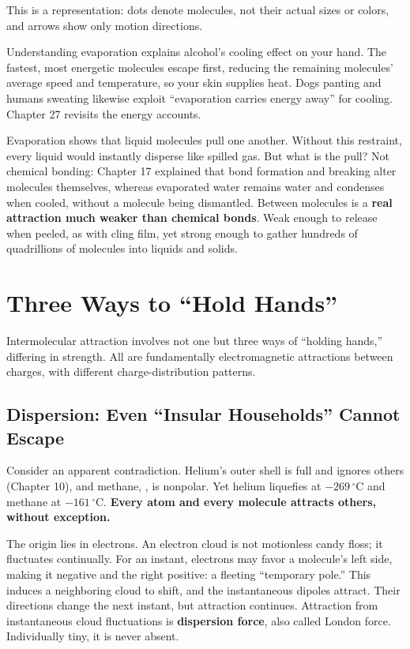 This is a representation: dots denote molecules, not their actual sizes or colors, and arrows show only motion directions.

Understanding evaporation explains alcohol's cooling effect on your hand. The fastest, most energetic molecules escape first, reducing the remaining molecules' average speed and temperature, so your skin supplies heat. Dogs panting and humans sweating likewise exploit ``evaporation carries energy away'' for cooling. Chapter 27 revisits the energy accounts.

Evaporation shows that liquid molecules pull one another. Without this restraint, every liquid would instantly disperse like spilled gas. But what is the pull? Not chemical bonding: Chapter 17 explained that bond formation and breaking alter molecules themselves, whereas evaporated water remains water and condenses when cooled, without a molecule being dismantled. Between molecules is a \textbf{real attraction much weaker than chemical bonds}. Weak enough to release when peeled, as with cling film, yet strong enough to gather hundreds of quadrillions of molecules into liquids and solids.

\section{Three Ways to ``Hold Hands''}

Intermolecular attraction involves not one but three ways of ``holding hands,'' differing in strength. All are fundamentally electromagnetic attractions between charges, with different charge-distribution patterns.

\subsection{Dispersion: Even ``Insular Households'' Cannot Escape}

Consider an apparent contradiction. Helium's outer shell is full and ignores others (Chapter 10), and methane, , is nonpolar. Yet helium liquefies at $-269\,^{\circ}\mathrm{C}$ and methane at $-161\,^{\circ}\mathrm{C}$. \textbf{Every atom and every molecule attracts others, without exception.}

The origin lies in electrons. An electron cloud is not motionless candy floss; it fluctuates continually. For an instant, electrons may favor a molecule's left side, making it negative and the right positive: a fleeting ``temporary pole.'' This induces a neighboring cloud to shift, and the instantaneous dipoles attract. Their directions change the next instant, but attraction continues. Attraction from instantaneous cloud fluctuations is \textbf{dispersion force}, also called London force. Individually tiny, it is never absent.

